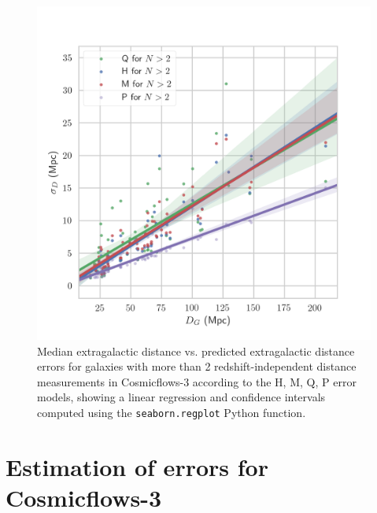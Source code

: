 \documentclass[a4paper,fleqn,usenatbib]{mnras}
\begin{document}
\begin{figure}
	\includegraphics[scale=0.7]{CF3high.png}
    \caption{Median extragalactic distance vs. predicted extragalactic distance errors for galaxies with more than 2 redshift-independent distance measurements in Cosmicflows-3 according to the H, M, Q, P error models, showing a linear regression and confidence intervals computed using the \texttt{seaborn.regplot} Python function.}
    \label{fig:CF3high}
\end{figure}
\section{Estimation of errors for Cosmicflows-3}




\bsp	%
\label{lastpage}
\end{document}
